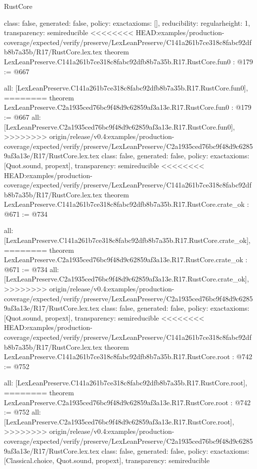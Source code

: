 \begin{lexlean}{RustCore}
\begin{coremodule}
{\begin{coremodule}
{{{  class: false,
  generated: false,
  policy: exact{axioms: []},
  reducibility: regular{height: 1},
  transparency: semireducible
}
<<<<<<<< HEAD:examples/production-coverage/expected/verify/preserve/LexLeanPreserve/C141a261b7ce318c8fabc92dfb8b7a35b/R17/RustCore.lex.tex
theorem LexLeanPreserve.C141a261b7ce318c8fabc92dfb8b7a35b.R17.RustCore.fun0 : @179 := @667 {
  all: [LexLeanPreserve.C141a261b7ce318c8fabc92dfb8b7a35b.R17.RustCore.fun0],
========
theorem LexLeanPreserve.C2a1935ced76bc9f48d9c62859af3a13e.R17.RustCore.fun0 : @179 := @667 {
  all: [LexLeanPreserve.C2a1935ced76bc9f48d9c62859af3a13e.R17.RustCore.fun0],
>>>>>>>> origin/release/v0.4:examples/production-coverage/expected/verify/preserve/LexLeanPreserve/C2a1935ced76bc9f48d9c62859af3a13e/R17/RustCore.lex.tex
  class: false,
  generated: false,
  policy: exact{axioms: [Quot.sound, propext]},
  transparency: semireducible
}
<<<<<<<< HEAD:examples/production-coverage/expected/verify/preserve/LexLeanPreserve/C141a261b7ce318c8fabc92dfb8b7a35b/R17/RustCore.lex.tex
theorem LexLeanPreserve.C141a261b7ce318c8fabc92dfb8b7a35b.R17.RustCore.crate_ok : @671 := @734 {
  all: [LexLeanPreserve.C141a261b7ce318c8fabc92dfb8b7a35b.R17.RustCore.crate_ok],
========
theorem LexLeanPreserve.C2a1935ced76bc9f48d9c62859af3a13e.R17.RustCore.crate_ok : @671 := @734 {
  all: [LexLeanPreserve.C2a1935ced76bc9f48d9c62859af3a13e.R17.RustCore.crate_ok],
>>>>>>>> origin/release/v0.4:examples/production-coverage/expected/verify/preserve/LexLeanPreserve/C2a1935ced76bc9f48d9c62859af3a13e/R17/RustCore.lex.tex
  class: false,
  generated: false,
  policy: exact{axioms: [Quot.sound, propext]},
  transparency: semireducible
}
<<<<<<<< HEAD:examples/production-coverage/expected/verify/preserve/LexLeanPreserve/C141a261b7ce318c8fabc92dfb8b7a35b/R17/RustCore.lex.tex
theorem LexLeanPreserve.C141a261b7ce318c8fabc92dfb8b7a35b.R17.RustCore.root : @742 := @752 {
  all: [LexLeanPreserve.C141a261b7ce318c8fabc92dfb8b7a35b.R17.RustCore.root],
========
theorem LexLeanPreserve.C2a1935ced76bc9f48d9c62859af3a13e.R17.RustCore.root : @742 := @752 {
  all: [LexLeanPreserve.C2a1935ced76bc9f48d9c62859af3a13e.R17.RustCore.root],
>>>>>>>> origin/release/v0.4:examples/production-coverage/expected/verify/preserve/LexLeanPreserve/C2a1935ced76bc9f48d9c62859af3a13e/R17/RustCore.lex.tex
  class: false,
  generated: false,
  policy: exact{axioms: [Classical.choice, Quot.sound, propext]},
  transparency: semireducible
}

}}}}}
\end{coremodule}}
\end{coremodule}
\end{lexlean}
